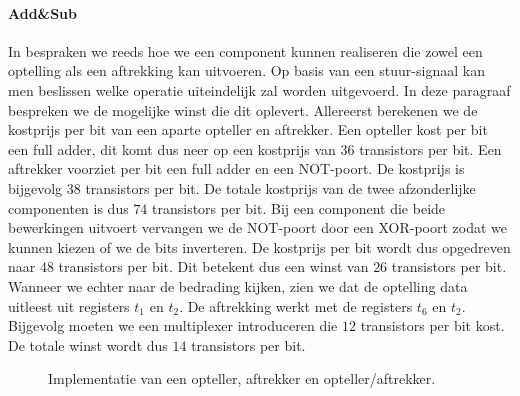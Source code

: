 \paragraph{Add\&Sub}In  bespraken we reeds hoe we een component kunnen realiseren die zowel een optelling als een aftrekking kan uitvoeren. Op basis van een stuur-signaal kan men beslissen welke operatie uiteindelijk zal worden uitgevoerd. In deze paragraaf bespreken we de mogelijke winst die dit oplevert. Allereerst berekenen we de kostprijs per bit van een aparte opteller en aftrekker. Een opteller kost per bit een full adder, dit komt dus neer op een kostprijs van $36$ transistors per bit. Een aftrekker voorziet per bit een full adder en een NOT-poort. De kostprijs is bijgevolg $38$ transistors per bit. De totale kostprijs van de twee afzonderlijke componenten is dus $74$ transistors per bit. Bij een component die beide bewerkingen uitvoert vervangen we de NOT-poort door een XOR-poort zodat we kunnen kiezen of we de bits inverteren. De kostprijs per bit wordt dus opgedreven naar $48$ transistors per bit. Dit betekent dus een winst van $26$ transistors per bit. Wanneer we echter naar de bedrading kijken, zien we dat de optelling data uitleest uit registers $t_1$ en $t_2$. De aftrekking werkt met de registers $t_6$ en $t_2$. Bijgevolg moeten we een multiplexer introduceren die $12$ transistors per bit kost. De totale winst wordt dus $14$ transistors per bit.
\begin{figure}[hbt]
\centering
{}
\caption{Implementatie van een opteller, aftrekker en opteller/aftrekker.}
\end{figure}
